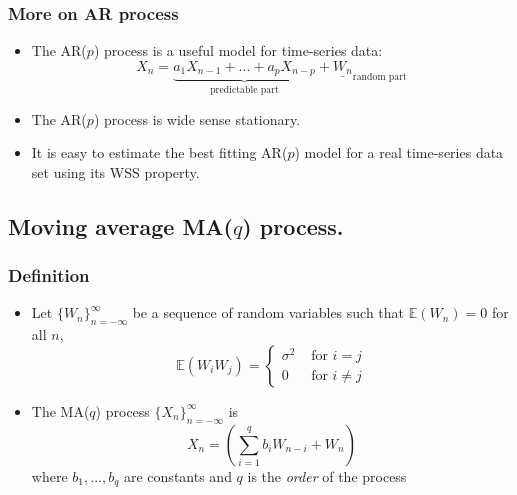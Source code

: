 \documentclass[12pt]{article}
\newcommand{\sigd}{\sigma^2}
\newcommand{\mexpval}[1]{\mathbb{E}(#1)}
\newcommand{\summ}[2]{\sum_{#1}^{#2}}
\newcommand{\arproc}[1]{$\{#1_n \}_{n=-\infty}^{\infty}$}
\begin{document}
\subsubsection{More on AR process}
\begin{itemize}
    \item The AR($p$) process is a useful model for time-series data:
    \[
    X_n = \underbrace{a_1 X_{n-1} + ... + a_p X_{n-p}}_{\textrm{predictable part}} + \underline{W_n}_{\textrm{random part}}
    \]
    \item The AR($p$) process is wide sense stationary.
    \item It is easy to estimate the best fitting AR($p$) model for a real time-series data set using its WSS property.
\end{itemize}

\subsection{Moving average MA($q$) process.}
\subsubsection{Definition}
\begin{itemize}
\item Let \arproc{W} be a sequence of random variables such that $\mexpval{W_n} = 0$ for all $n$, 
\[
\mexpval{W_i W_j} = \left\{\begin{array}{cc}
   \sigd  & \textrm{ for } i=j \\
   0  & \textrm{ for } i \not =j
\end{array} \right.
\]
\item The MA($q$) process \arproc{X} is
\[
X_n = \left( \summ{i=1}{q}b_i W_{n-i} + W_n\right)
\]
where $b_1,...,b_q$ are constants and $q$ is the \textit{order} of the process
\end{itemize}
\end{document}
